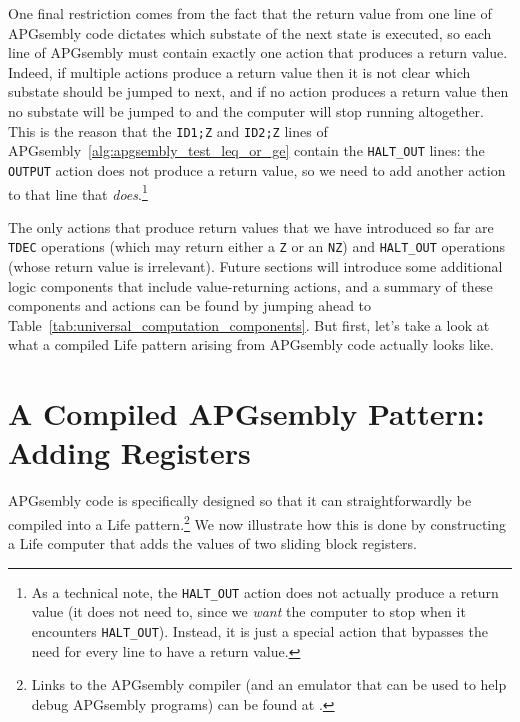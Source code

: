 One final restriction comes from the fact that the return value from one line of APGsembly code dictates which substate of the next state is executed, so each line of APGsembly must contain exactly one action that produces a return value. Indeed, if multiple actions produce a return value then it is not clear which substate should be jumped to next, and if no action produces a return value then no substate will be jumped to and the computer will stop running altogether. This is the reason that the \texttt{ID1;Z} and \texttt{ID2;Z} lines of APGsembly~\ref{alg:apgsembly_test_leq_or_ge} contain the \texttt{HALT\_OUT} lines: the \texttt{OUTPUT} action does not produce a return value, so we need to add another action to that line that \emph{does}.\footnote{As a technical note, the \texttt{HALT\_OUT} action does not actually produce a return value (it does not need to, since we \emph{want} the computer to stop when it encounters \texttt{HALT\_OUT}). Instead, it is just a special action that bypasses the need for every line to have a return value.}

The only actions that produce return values that we have introduced so far are \texttt{TDEC} operations (which may return either a \texttt{Z} or an \texttt{NZ}) and \texttt{HALT\_OUT} operations (whose return value is irrelevant). Future sections will introduce some additional logic components that include value-returning actions, and a summary of these components and actions can be found by jumping ahead to Table~\ref{tab:universal_computation_components}. But first, let's take a look at what a compiled Life pattern arising from APGsembly code actually looks like.


\section{A Compiled APGsembly Pattern: Adding Registers}\label{sec:compiled_add_two_registers}

APGsembly code is specifically designed so that it can straightforwardly be compiled into a Life pattern.\footnote{Links to the APGsembly compiler (and an emulator that can be used to help debug APGsembly programs) can be found at .} We now illustrate how this is done by constructing a Life computer that adds the values of two sliding block registers.

